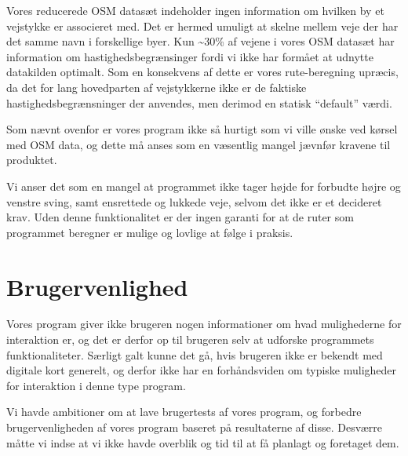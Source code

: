 Vores reducerede OSM datasæt indeholder ingen information om hvilken by et vejstykke er associeret med. Det er hermed umuligt at skelne mellem veje der har det samme navn i forskellige byer. Kun \textasciitilde30\% af vejene i vores OSM datasæt har information om hastighedsbegrænsinger fordi vi ikke har formået at udnytte datakilden optimalt. Som en konsekvens af dette er vores rute-beregning upræcis, da det for lang hovedparten af vejstykkerne ikke er de faktiske hastighedsbegrænsninger der anvendes, men derimod en statisk ``default'' værdi.

Som nævnt ovenfor er vores program ikke så hurtigt som vi ville ønske ved kørsel med OSM data, og dette må anses som en væsentlig mangel jævnfør kravene til produktet.

Vi anser det som en mangel at programmet ikke tager højde for forbudte højre og venstre sving, samt ensrettede og lukkede veje, selvom det ikke er et decideret krav. Uden denne funktionalitet er der ingen garanti for at de ruter som programmet beregner er mulige og lovlige at følge i praksis.

\section{Brugervenlighed}
\label{sec:brugervenlighed}

Vores program giver ikke brugeren nogen informationer om hvad mulighederne for interaktion er, og det er derfor op til brugeren selv at udforske programmets funktionaliteter. Særligt galt kunne det gå, hvis brugeren ikke er bekendt med digitale kort generelt, og derfor ikke har en forhåndsviden om typiske muligheder for interaktion i denne type program. 

Vi havde ambitioner om at lave brugertests af vores program, og forbedre brugervenligheden af vores program baseret på resultaterne af disse. Desværre måtte vi indse at vi ikke havde overblik og tid til at få planlagt og foretaget dem.